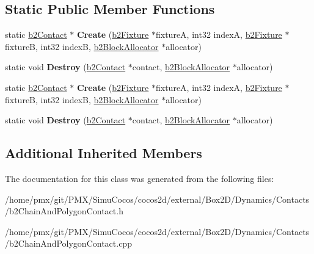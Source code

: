 \subsection*{Static Public Member Functions}
\begin{DoxyCompactItemize}
\item 
\mbox{\label{classb2ChainAndPolygonContact_a03e9021485104ae8f485f986703fcd85}} 
static \hyperlink{classb2Contact}{b2\+Contact} $\ast$ {\bfseries Create} (\hyperlink{classb2Fixture}{b2\+Fixture} $\ast$fixtureA, int32 indexA, \hyperlink{classb2Fixture}{b2\+Fixture} $\ast$fixtureB, int32 indexB, \hyperlink{classb2BlockAllocator}{b2\+Block\+Allocator} $\ast$allocator)
\item 
\mbox{\label{classb2ChainAndPolygonContact_aa31bf71d64dd78583505b6da76ef289c}} 
static void {\bfseries Destroy} (\hyperlink{classb2Contact}{b2\+Contact} $\ast$contact, \hyperlink{classb2BlockAllocator}{b2\+Block\+Allocator} $\ast$allocator)
\item 
\mbox{\label{classb2ChainAndPolygonContact_aae40d48ef8f2a49297a38c615a79e3b2}} 
static \hyperlink{classb2Contact}{b2\+Contact} $\ast$ {\bfseries Create} (\hyperlink{classb2Fixture}{b2\+Fixture} $\ast$fixtureA, int32 indexA, \hyperlink{classb2Fixture}{b2\+Fixture} $\ast$fixtureB, int32 indexB, \hyperlink{classb2BlockAllocator}{b2\+Block\+Allocator} $\ast$allocator)
\item 
\mbox{\label{classb2ChainAndPolygonContact_aed8a69453a9d7bb77a3c2b70fb20c764}} 
static void {\bfseries Destroy} (\hyperlink{classb2Contact}{b2\+Contact} $\ast$contact, \hyperlink{classb2BlockAllocator}{b2\+Block\+Allocator} $\ast$allocator)
\end{DoxyCompactItemize}
\subsection*{Additional Inherited Members}


The documentation for this class was generated from the following files\+:\begin{DoxyCompactItemize}
\item 
/home/pmx/git/\+P\+M\+X/\+Simu\+Cocos/cocos2d/external/\+Box2\+D/\+Dynamics/\+Contacts/b2\+Chain\+And\+Polygon\+Contact.\+h\item 
/home/pmx/git/\+P\+M\+X/\+Simu\+Cocos/cocos2d/external/\+Box2\+D/\+Dynamics/\+Contacts/b2\+Chain\+And\+Polygon\+Contact.\+cpp\end{DoxyCompactItemize}
